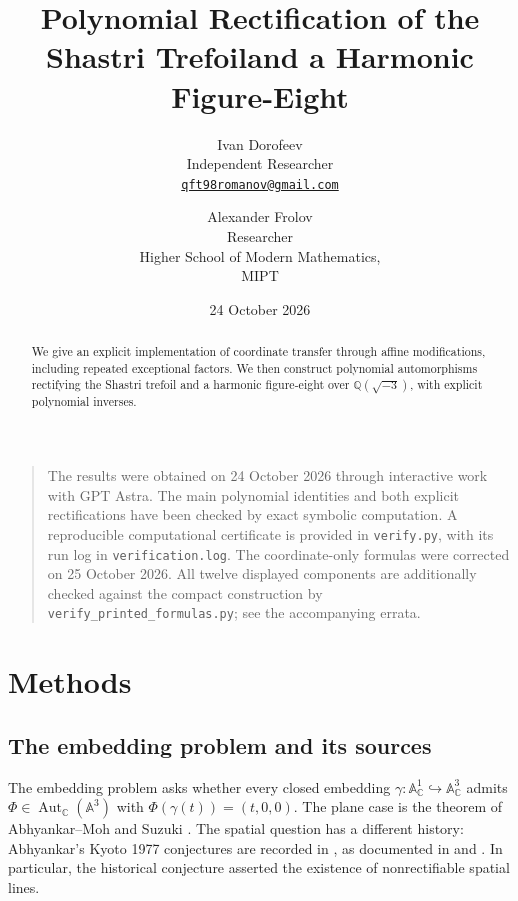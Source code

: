 \documentclass[11pt,a4paper]{article}
\title{\vspace{-15mm}\LARGE\bfseries Polynomial Rectification of the Shastri Trefoil\newline and a Harmonic Figure-Eight}
\author{Ivan Dorofeev\\[3pt]\normalsize Independent Researcher\\\normalsize\href{mailto:qft98romanov@gmail.com}{\texttt{qft98romanov@gmail.com}}\and Alexander Frolov\\[3pt]\normalsize Researcher\\\small Higher School of Modern Mathematics,\\\small MIPT}
\date{24 October 2026}
\newcommand{\A}{\mathbb A}
\newcommand{\Q}{\mathbb Q}
\newcommand{\C}{\mathbb C}
\begin{document}
\maketitle
\thispagestyle{empty}
\vspace{-4mm}

\begin{abstract}
We give an explicit implementation of coordinate transfer through affine
modifications, including repeated exceptional factors. We then
construct polynomial automorphisms rectifying the Shastri trefoil and a
harmonic figure-eight over $\Q(\sqrt{-3})$, with explicit polynomial inverses.
\end{abstract}



\smallskip
\begin{quote}\small
The results were obtained on 24 October 2026 through interactive work with
GPT Astra. The main polynomial identities and both explicit rectifications
have been checked by exact symbolic computation. A reproducible
computational certificate is provided in \texttt{verify.py}, with its run
log in \texttt{verification.log}.
The coordinate-only formulas were corrected on 25 October 2026. All twelve displayed components are additionally checked against the compact construction by \texttt{verify\_printed\_formulas.py}; see the accompanying errata.
\end{quote}

\section{Methods}

\subsection{The embedding problem and its sources}

The embedding problem asks whether every closed embedding
$\gamma:\A^1_{\C}\hookrightarrow\A^3_{\C}$ admits
$\Phi\in\operatorname{Aut}_{\C}(\A^3)$ with
$\Phi(\gamma(t))=(t,0,0)$. The plane case is the theorem of
Abhyankar--Moh and Suzuki \cite{AM,Suzuki}. The spatial question has a
different history: Abhyankar's Kyoto 1977 conjectures are recorded in
\cite[Chapter 11, pp.~413--414]{Abhyankar}, as documented in
\cite[Introduction, pp.~115--116]{Craighero} and
\cite[\S1, p.~11]{Shastri}. In particular, the historical conjecture
asserted the existence of nonrectifiable spatial lines.
\end{document}
